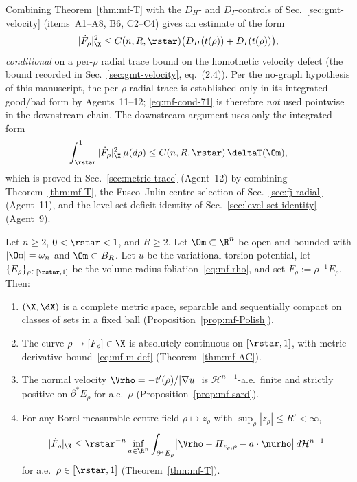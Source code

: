 Combining Theorem~\ref{thm:mf-T} with the
$D_H$- and $D_I$-controls of Sec.~\ref{sec:gmt-velocity}
(items~A1--A8, B6, C2--C4) gives an estimate of the form
\begin{equation}\label{eq:mf-cond-71}
   |\dot F_\rho|_\X^2\le C(n,R,\rstar)\bigl(D_H(t(\rho))+D_I(t(\rho))\bigr),
\end{equation}
\emph{conditional} on a per-$\rho$ radial trace bound on the homothetic
velocity defect (the bound recorded in Sec.~\ref{sec:gmt-velocity}, eq.~(2.4)).
Per the no-graph hypothesis of this manuscript, the per-$\rho$ radial trace
is established only in its integrated good/bad form by Agents~11--12;
\eqref{eq:mf-cond-71} is therefore \emph{not} used pointwise in the
downstream chain. The downstream argument uses only the integrated form
\begin{equation}\label{eq:mf-int-cond}
   \int_{\rstar}^{1}|\dot F_\rho|_\X^2\,\mu(d\rho)
   \le C(n,R,\rstar)\,\deltaT(\Om),
\end{equation}
which is proved in Sec.~\ref{sec:metric-trace} (Agent~12) by combining
Theorem~\ref{thm:mf-T}, the Fusco--Julin centre selection of
Sec.~\ref{sec:fj-radial} (Agent~11), and the level-set deficit identity of
Sec.~\ref{sec:level-set-identity} (Agent~9).

\begin{theorem}\label{thm:mf-main}
Let $n\ge 2$, $0<\rstar<1$, and $R\ge 2$. Let $\Om\subset\R^n$ be open and
bounded with $|\Om|=\omega_n$ and $\Om\subset B_R$. Let $u$ be the
variational torsion potential, let $\{E_\rho\}_{\rho\in[\rstar,1]}$ be the
volume-radius foliation~\eqref{eq:mf-rho}, and set $F_\rho:=\rho^{-1}E_\rho$.
Then:
\begin{enumerate}
\item[(i)] $(\X,\dX)$ is a complete metric space, separable and
sequentially compact on classes of sets in a fixed ball
(Proposition~\ref{prop:mf-Polish}).
\item[(ii)] The curve $\rho\mapsto[F_\rho]\in\X$ is absolutely continuous on
$[\rstar,1]$, with metric-derivative bound~\eqref{eq:mf-m-def}
(Theorem~\ref{thm:mf-AC}).
\item[(iii)] The normal velocity $\Vrho=-t'(\rho)/|\nabla u|$ is
$\mathcal H^{n-1}$-a.e.\ finite and strictly positive on $\partial^*E_\rho$
for a.e.~$\rho$ (Proposition~\ref{prop:mf-sard}).
\item[(iv)] For any Borel-measurable centre field $\rho\mapsto z_\rho$ with
$\sup_\rho|z_\rho|\le R'<\infty$,
\begin{equation}\label{eq:mf-final}
   |\dot F_\rho|_\X\le\rstar^{-n}\inf_{a\in\R^n}
   \int_{\partial^*E_\rho}
      \bigl|\Vrho-H_{z_\rho,\rho}-a\cdot\nurho\bigr|
      \,d\mathcal H^{n-1}
\end{equation}
for a.e.~$\rho\in[\rstar,1]$ (Theorem~\ref{thm:mf-T}).
\end{enumerate}
\end{theorem}


